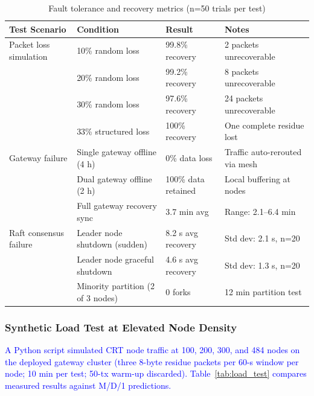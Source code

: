 \documentclass[pdflatex,sn-mathphys-num]{sn-jnl}
\theoremstyle{thmstyleone}
\theoremstyle{thmstyletwo}
\theoremstyle{thmstylethree}
\begin{document}
{\begin{table}[htbp]
\centering
\caption{Fault tolerance and recovery metrics (n=50 trials per test)}
\label{tab:fault-tolerance}
\footnotesize
\setlength{\tabcolsep}{3pt}
\begin{tabular}{p{2.0cm}p{2.5cm}p{1.8cm}p{2.2cm}}
\toprule
\textbf{Test Scenario} & \textbf{Condition} & \textbf{Result} & \textbf{Notes} \\
\midrule
Packet loss simulation  & 10\% random loss   & 99.8\% recovery  & 2 packets unrecoverable \\
                        & 20\% random loss   & 99.2\% recovery  & 8 packets unrecoverable \\
                        & 30\% random loss   & 97.6\% recovery  & 24 packets unrecoverable \\
                        & 33\% structured loss & 100\% recovery & One complete residue lost \\
\midrule
Gateway failure         & Single gateway offline (4 h)   & 0\% data loss & Traffic auto-rerouted via mesh \\
                        & Dual gateway offline (2 h)      & 100\% data retained & Local buffering at nodes \\
                        & Full gateway recovery sync        & 3.7 min avg & Range: 2.1–6.4 min \\
\midrule
Raft consensus failure  & Leader node shutdown (sudden)    & 8.2 s avg recovery & Std dev: 2.1 s, n=20 \\
                        & Leader node graceful shutdown    & 4.6 s avg recovery & Std dev: 1.3 s, n=20 \\
                        & Minority partition (2 of 3 nodes) & 0 forks & 12 min partition test \\
\bottomrule
\end{tabular}
\end{table}

\subsubsection{Synthetic Load Test at Elevated Node Density}
\label{subsubsec:load_test}

\textcolor{blue}{A Python script simulated CRT node traffic at 100, 200, 300, and 484 nodes on the deployed gateway cluster (three 8-byte residue packets per 60-s window per node; 10 min per test; 50-tx warm-up discarded). Table~\ref{tab:load_test} compares measured results against M/D/1 predictions.}

}
\end{document}
